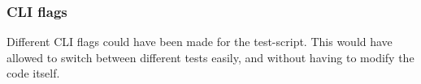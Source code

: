 \subsubsection{CLI flags}
Different CLI flags could have been made for the test-script. This would have allowed to switch between different tests easily, and without having to modify the code itself.
\pagebreak